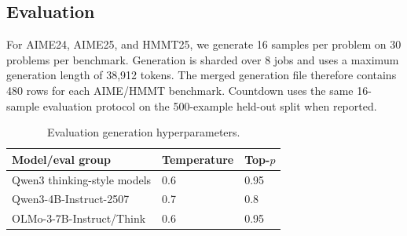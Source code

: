 \begin{table}[!htbp]
    \centering
    \small
    \caption{Model-specific \opsd{} training settings and deviations from
    Table~\ref{tab:opsd-training-hparams}.}
    \label{tab:model-training-hparams}
\end{table}

\subsection{Evaluation}
\label{app:evaluation}

For AIME24, AIME25, and HMMT25, we generate 16 samples per problem on 30
problems per benchmark. Generation is sharded over 8 jobs and uses a maximum
generation length of 38,912 tokens. The merged generation file therefore
contains 480 rows for each AIME/HMMT benchmark. Countdown uses the same
16-sample evaluation protocol on the 500-example held-out split when reported.

\begin{table}[!htbp]
    \centering
    \small
    \caption{Evaluation generation hyperparameters.}
    \label{tab:eval-hparams}
    \begin{tabular}{lll}
        \toprule
        Model/eval group & Temperature & Top-$p$ \\
        \midrule
        Qwen3 thinking-style models & 0.6 & 0.95 \\
        Qwen3-4B-Instruct-2507 & 0.7 & 0.8 \\
        OLMo-3-7B-Instruct/Think & 0.6 & 0.95 \\
        \bottomrule
    \end{tabular}
\end{table}

